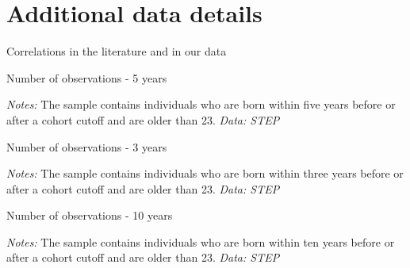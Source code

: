 \section{Additional data details}
\setcounter{table}{0}
\setcounter{figure}{0}
\renewcommand{\thetable}{\Alph{section}.\arabic{table}}
\renewcommand\thefigure{\Alph{section}.\arabic{figure}}


\begin{table}[htbp]
	\centering
	\caption{Correlations in the literature and in our data}
	\label{tab:correlations}
	
\end{table}


\begin{table}[htbp]
	\caption{Number of observations - 5 years}
	\label{tab:nobs_5y}
	\centering
	\begin{threeparttable}
		
		\begin{tablenotes}
			\small
			\item \textit{Notes:} The sample contains individuals who are born within five years before or after a cohort cutoff and are older than 23. \textit{Data: STEP}
		\end{tablenotes}
	\end{threeparttable}
\end{table}

\begin{table}[htbp]
	\caption{Number of observations - 3 years}
	\label{tab:nobs_3y}
	\centering
	\begin{threeparttable}
		
		\begin{tablenotes}
			\small
			\item \textit{Notes:} The sample contains individuals who are born within three years before or after a cohort cutoff and are older than 23. \textit{Data: STEP}
		\end{tablenotes}
	\end{threeparttable}
\end{table}

\begin{table}[htbp]
	\caption{Number of observations - 10 years}
	\label{tab:nobs_10y}
	\centering
	\begin{threeparttable}
		
		\begin{tablenotes}
			\small
			\item \textit{Notes:} The sample contains individuals who are born within ten years before or after a cohort cutoff and are older than 23. \textit{Data: STEP}
		\end{tablenotes}
	\end{threeparttable}
\end{table}


